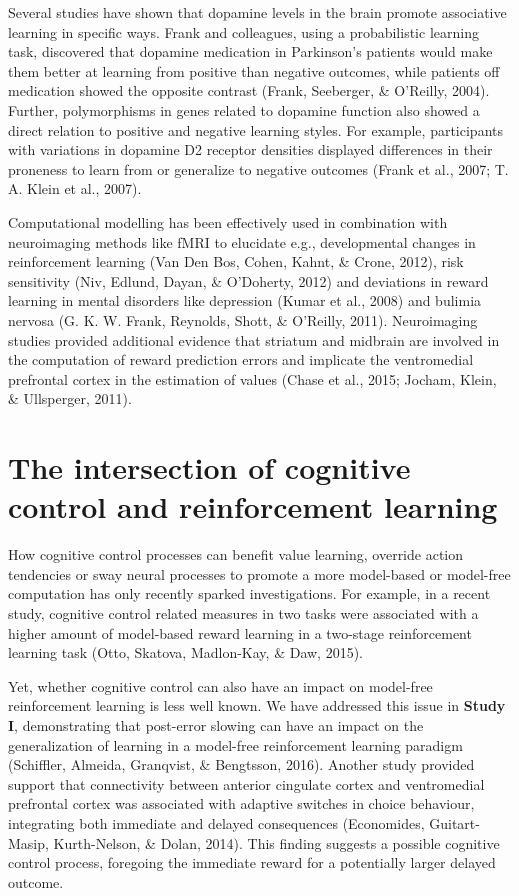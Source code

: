 \documentclass[12pt,openany]{book}
\theoremstyle{definition}
\theoremstyle{definition}
\theoremstyle{definition}
\theoremstyle{remark}
\begin{document}
Several studies have shown that dopamine levels in the brain promote
associative learning in specific ways. Frank and colleagues, using a
probabilistic learning task, discovered that dopamine medication in
Parkinson's patients would make them better at learning from positive
than negative outcomes, while patients off medication showed the
opposite contrast (Frank, Seeberger, \& O'Reilly, 2004). Further,
polymorphisms in genes related to dopamine function also showed a direct
relation to positive and negative learning styles. For example,
participants with variations in dopamine D2 receptor densities displayed
differences in their proneness to learn from or generalize to negative
outcomes (Frank et al., 2007; T. A. Klein et al., 2007).

Computational modelling has been effectively used in combination with
neuroimaging methods like fMRI to elucidate e.g., developmental changes
in reinforcement learning (Van Den Bos, Cohen, Kahnt, \& Crone, 2012),
risk sensitivity (Niv, Edlund, Dayan, \& O'Doherty, 2012) and deviations
in reward learning in mental disorders like depression (Kumar et al.,
2008) and bulimia nervosa (G. K. W. Frank, Reynolds, Shott, \& O'Reilly,
2011). Neuroimaging studies provided additional evidence that striatum
and midbrain are involved in the computation of reward prediction errors
and implicate the ventromedial prefrontal cortex in the estimation of
values (Chase et al., 2015; Jocham, Klein, \& Ullsperger, 2011).

\section{The intersection of cognitive control and reinforcement
learning}\label{the-intersection-of-cognitive-control-and-reinforcement-learning}

How cognitive control processes can benefit value learning, override
action tendencies or sway neural processes to promote a more model-based
or model-free computation has only recently sparked investigations. For
example, in a recent study, cognitive control related measures in two
tasks were associated with a higher amount of model-based reward
learning in a two-stage reinforcement learning task (Otto, Skatova,
Madlon-Kay, \& Daw, 2015).

Yet, whether cognitive control can also have an impact on model-free
reinforcement learning is less well known. We have addressed this issue
in \textbf{Study I}, demonstrating that post-error slowing can have an
impact on the generalization of learning in a model-free reinforcement
learning paradigm (Schiffler, Almeida, Granqvist, \& Bengtsson, 2016).
Another study provided support that connectivity between anterior
cingulate cortex and ventromedial prefrontal cortex was associated with
adaptive switches in choice behaviour, integrating both immediate and
delayed consequences (Economides, Guitart-Masip, Kurth-Nelson, \& Dolan,
2014). This finding suggests a possible cognitive control process,
foregoing the immediate reward for a potentially larger delayed outcome.
\end{document}
